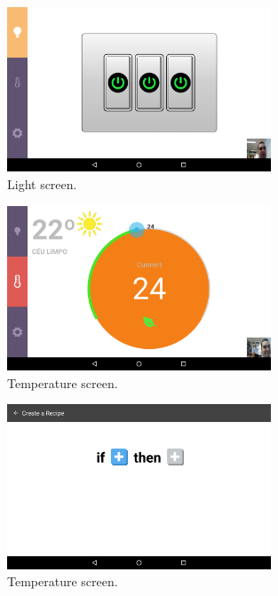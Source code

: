 \begin{figure}[h]
\centering
\includegraphics[width=0.7\textwidth]{Figures/screen_lights}
\caption{Light screen.}
\label{screen_lights}
\end{figure}


\begin{figure}[h]
\centering
\includegraphics[width=0.7\textwidth]{Figures/screen_temperature}
\caption{Temperature screen.}
\label{screen_temperature}
\end{figure}



\begin{figure}[h]
\centering
\includegraphics[width=0.7\textwidth]{Figures/create_recipe}
\caption{Temperature screen.}
\label{create_recipe}
\end{figure}


